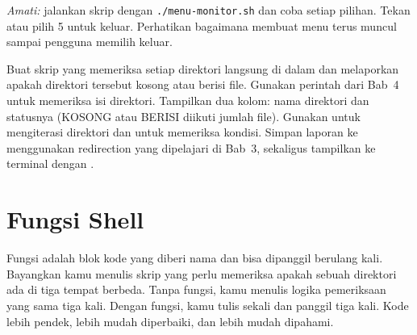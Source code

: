 \begin{enumerate}
    \textit{Amati:} jalankan skrip dengan \texttt{./menu-monitor.sh} dan
    coba setiap pilihan. Tekan  atau pilih 5 untuk
    keluar. Perhatikan bagaimana  membuat menu terus
    muncul sampai pengguna memilih keluar.
\end{enumerate}

\begin{challengebox}
Buat skrip  yang memeriksa setiap direktori langsung di
dalam  dan melaporkan apakah direktori tersebut kosong atau
berisi file. Gunakan perintah  dari Bab~4 untuk memeriksa isi
direktori. Tampilkan dua kolom: nama direktori dan statusnya (KOSONG atau
BERISI diikuti jumlah file). Gunakan  untuk mengiterasi direktori
dan  untuk memeriksa kondisi. Simpan laporan ke
 menggunakan
redirection yang dipelajari di Bab~3, sekaligus tampilkan ke terminal
dengan .
\end{challengebox}

\section{Fungsi Shell}
\label{sec:fungsi-shell-skrip}

Fungsi adalah blok kode yang diberi nama dan bisa dipanggil berulang kali.
Bayangkan kamu menulis skrip yang perlu memeriksa apakah sebuah direktori
ada di tiga tempat berbeda. Tanpa fungsi, kamu menulis logika pemeriksaan
yang sama tiga kali. Dengan fungsi, kamu tulis sekali dan panggil tiga
kali. Kode lebih pendek, lebih mudah diperbaiki, dan lebih mudah dipahami.

